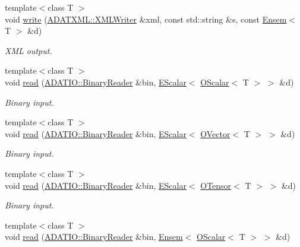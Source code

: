 \begin{DoxyCompactItemize}
\item 
{\footnotesize template$<$class T $>$ }\\void \mbox{\hyperlink{namespaceENSEM_abde35864d26ad5898166c7b3377e5a61}{write}} (\mbox{\hyperlink{classADATXML_1_1XMLWriter}{A\+D\+A\+T\+X\+M\+L\+::\+X\+M\+L\+Writer}} \&xml, const std\+::string \&s, const \mbox{\hyperlink{classENSEM_1_1Ensem}{Ensem}}$<$ T $>$ \&d)
\begin{DoxyCompactList}\small\item\em X\+ML output. \end{DoxyCompactList}\item 
{\footnotesize template$<$class T $>$ }\\void \mbox{\hyperlink{namespaceENSEM_ac9e6dd1b65ee654fcdc9d028ba4f1254}{read}} (\mbox{\hyperlink{classADATIO_1_1BinaryReader}{A\+D\+A\+T\+I\+O\+::\+Binary\+Reader}} \&bin, \mbox{\hyperlink{classENSEM_1_1EScalar}{E\+Scalar}}$<$ \mbox{\hyperlink{classENSEM_1_1OScalar}{O\+Scalar}}$<$ T $>$ $>$ \&d)
\begin{DoxyCompactList}\small\item\em Binary input. \end{DoxyCompactList}\item 
{\footnotesize template$<$class T $>$ }\\void \mbox{\hyperlink{namespaceENSEM_a263669f863c2a53acb71cfc540a21e0f}{read}} (\mbox{\hyperlink{classADATIO_1_1BinaryReader}{A\+D\+A\+T\+I\+O\+::\+Binary\+Reader}} \&bin, \mbox{\hyperlink{classENSEM_1_1EScalar}{E\+Scalar}}$<$ \mbox{\hyperlink{classENSEM_1_1OVector}{O\+Vector}}$<$ T $>$ $>$ \&d)
\begin{DoxyCompactList}\small\item\em Binary input. \end{DoxyCompactList}\item 
{\footnotesize template$<$class T $>$ }\\void \mbox{\hyperlink{namespaceENSEM_afa38ef41983bd01a166feaa53c5b420d}{read}} (\mbox{\hyperlink{classADATIO_1_1BinaryReader}{A\+D\+A\+T\+I\+O\+::\+Binary\+Reader}} \&bin, \mbox{\hyperlink{classENSEM_1_1EScalar}{E\+Scalar}}$<$ \mbox{\hyperlink{classENSEM_1_1OTensor}{O\+Tensor}}$<$ T $>$ $>$ \&d)
\begin{DoxyCompactList}\small\item\em Binary input. \end{DoxyCompactList}\item 
{\footnotesize template$<$class T $>$ }\\void \mbox{\hyperlink{namespaceENSEM_a6dcfc9e12db208a46499969e1cc0088d}{read}} (\mbox{\hyperlink{classADATIO_1_1BinaryReader}{A\+D\+A\+T\+I\+O\+::\+Binary\+Reader}} \&bin, \mbox{\hyperlink{classENSEM_1_1Ensem}{Ensem}}$<$ \mbox{\hyperlink{classENSEM_1_1OScalar}{O\+Scalar}}$<$ T $>$ $>$ \&d)

\end{DoxyCompactItemize}
